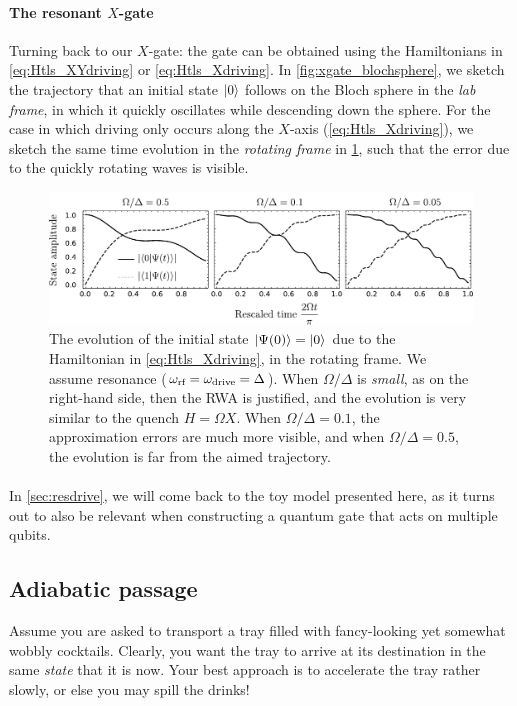 \paragraph{The resonant $X$-gate} Turning back to our $X$-gate: the gate can be obtained using the Hamiltonians in \cref{eq:Htls_XYdriving} or \cref{eq:Htls_Xdriving}. In \cref{fig:xgate_blochsphere}, we sketch the trajectory that an initial state $\lvert0\rangle$ follows on the Bloch sphere in the \emph{lab frame}, in which it quickly oscillates while descending down the sphere. For the case in which driving only occurs along the $X$-axis (\cref{eq:Htls_Xdriving}), we sketch the same time evolution in the \emph{rotating frame} in \cref{fig:xgate_rwa}, such that the error due to the quickly rotating waves is visible. 


\begin{figure}
\centering
\includegraphics[width=.95\textwidth]{img/DriveRWAPlots_row} 
\caption{The evolution of the initial state $\lvert\Psi(0)\rangle = \lvert0\rangle$ due to the Hamiltonian in \cref{eq:Htls_Xdriving},  in the rotating frame. We assume resonance ($\omega_\text{rf} = \omega_\text{drive} = \Delta$). When $\Omega / \Delta$ is \emph{small}, as on the right-hand side, then the RWA is justified, and the evolution is very similar to the quench $H = \Omega X$. When $\Omega / \Delta = 0.1$, the approximation errors are much more visible, and when $\Omega / \Delta = 0.5$, the evolution is far from the aimed trajectory. }
\label{fig:xgate_rwa}
\end{figure}


\paragraph{} In \cref{sec:resdrive}, we will come back to the toy model presented here, as it turns out to also be relevant when constructing a quantum gate that acts on multiple qubits. 


\subsection{Adiabatic passage}
\label{sec:adiabatic}
Assume you are asked to transport a tray filled with fancy-looking yet somewhat wobbly cocktails. Clearly, you want the tray to arrive at its destination in the same \emph{state} that it is now. Your best approach is to accelerate the tray rather slowly, or else you may spill the drinks! 

